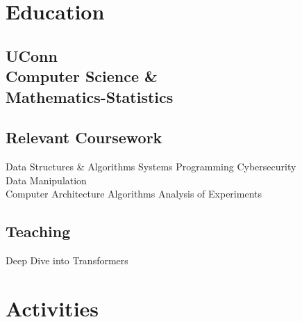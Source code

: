 \documentclass[]{resume-template}
\begin{document}
%
%
\lastupdated{}

%
%

%
%

\begin{minipage}[t]{0.33\textwidth}


	\section{Education}\label{sec:education}

	\subsection{UConn\\ Computer Science \&\\
		Mathematics-Statistics}\label{subsec:uconn}
	\vspace{\topsep}
	\subsection{Relevant Coursework}\label{subsec:coursework}
	Data Structures \& Algorithms \textbullet{} Systems Programming \textbullet{} Cybersecurity \textbullet{}\\ Data Manipulation\\
	Computer Architecture \textbullet{} Algorithms \textbullet{} Analysis of Experiments
	\sectionsep{}
	\subsection{Teaching}\label{subsec:teaching}
	Deep Dive into Transformers



	\section{Activities}\label{sec:activities}


\end{minipage}
\end{document}

